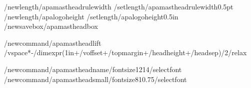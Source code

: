 %
/newlength{/apamastheadrulewidth}
/setlength{/apamastheadrulewidth}{0.5pt}
/newlength{/apalogoheight}
/setlength{/apalogoheight}{0.5in}
/newsavebox{/apamastheadbox}

%
/newcommand{/apamastheadlift}{%
  /vspace*{-/dimexpr(1in+/voffset+/topmargin+/headheight+/headsep)/2/relax}}

/newcommand{/apamastheadname}{/fontsize{12}{14}/selectfont}
/newcommand{/apamastheadsmall}{/fontsize{8}{10.75}/selectfont}

